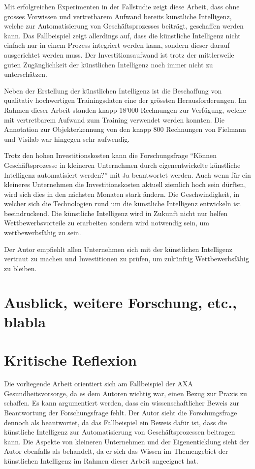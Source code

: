 Mit erfolgreichen Experimenten in der Fallstudie zeigt diese Arbeit, dass ohne grosses Vorwissen und vertretbarem Aufwand bereits künstliche Intelligenz, welche zur Automatisierung von Geschäftsprozesses beiträgt, geschaffen werden kann. Das Fallbeispiel zeigt allerdings auf, dass die künstliche Intelligenz nicht einfach nur in einem Prozess integriert werden kann, sondern dieser darauf ausgerichtet werden muss. Der Investitionsaufwand ist trotz der mittlerweile guten Zugänglichkeit der künstlichen Intelligenz noch immer nicht zu unterschätzen.

Neben der Erstellung der künstlichen Intelligenz ist die Beschaffung von qualitativ hochwertigen Trainingsdaten eine der grössten Herausforderungen. Im Rahmen dieser Arbeit standen knapp 18'000 Rechnungen zur Verfügung, welche mit vertretbarem Aufwand zum Training verwendet werden konnten. Die Annotation zur Objekterkennung von den knapp 800 Rechnungen von Fielmann und Visilab war hingegen sehr aufwendig. 

Trotz den hohen Investitionskosten kann die Forschungsfrage \enquote{Können Geschäftsprozesse in kleineren Unternehmen durch eigenentwickelte künstliche Intelligenz automatisiert werden?} mit Ja beantwortet werden. Auch wenn für ein kleineres Unternehmen die Investitionskosten aktuell ziemlich hoch sein dürften, wird sich dies in den nächsten Monaten stark ändern. Die Geschwindigkeit, in welcher sich die Technologien rund um die künstliche Intelligenz entwickeln ist beeindruckend. Die künstliche Intelligenz wird in Zukunft nicht nur helfen Wettbewerbsvorteile zu erarbeiten sondern wird notwendig sein, um wettbewerbsfähig zu sein.

Der Autor empfiehlt allen Unternehmen sich mit der künstlichen Intelligenz vertraut zu machen und Investitionen zu prüfen, um zukünftig Wettbewerbsfähig zu bleiben. 

\cleardoublepage
\section{Ausblick, weitere Forschung, etc., blabla}


\cleardoublepage
\section{Kritische Reflexion}
\label{chap:reflexion}

Die vorliegende Arbeit orientiert sich am Fallbeispiel der AXA Gesundheitsvorsorge, da es dem Autoren wichtig war, einen Bezug zur Praxis zu schaffen. Es kann argumentiert werden, dass ein wissenschaftlicher Beweis zur Beantwortung der Forschungsfrage fehlt. Der Autor sieht die Forschungsfrage dennoch als beantwortet, da das Fallbeispiel ein Beweis dafür ist, dass die künstliche Intelligenz zur Automatisierung von Geschäftsprozessen beitragen kann. Die Aspekte von kleineren Unternehmen und der Eigenenticklung sieht der Autor ebenfalls als behandelt, da er sich das Wissen im Themengebiet der künstlichen Intelligenz im Rahmen dieser Arbeit angeeignet hat.

